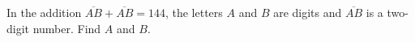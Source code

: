 In the addition $\overline{AB}+\overline{AB}=144$, the letters $A$ and $B$ are digits and $\overline{AB}$ is a two-digit number. Find $A$ and $B$.
